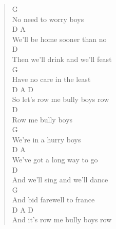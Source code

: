 \documentclass[11pt]{article}
\begin{document}
\begin{verse}
G\\
No need to worry boys\\
D                         A\\
We'll be home sooner than no\\
\hspace*{11em}D\\
Then we'll drink and we'll feast\\
\hspace*{8em}G\\
Have no care in the least\\
\hspace*{9em}D      A          D\\
So let's row me bully boys row\\
\vspace*{1em}
D\\
Row﻿ me bully boys\\
G\\
We're in a hurry boys\\
D                       A\\
We've got a long way to go\\
\hspace*{10em}D\\
And we'll sing and we'll dance\\
\hspace*{8em}G\\
And bid farewell to france\\
\hspace*{9em}D      A          D\\
And it's row me bully boys row\\
\end{verse}
\clearpage
\end{document}
